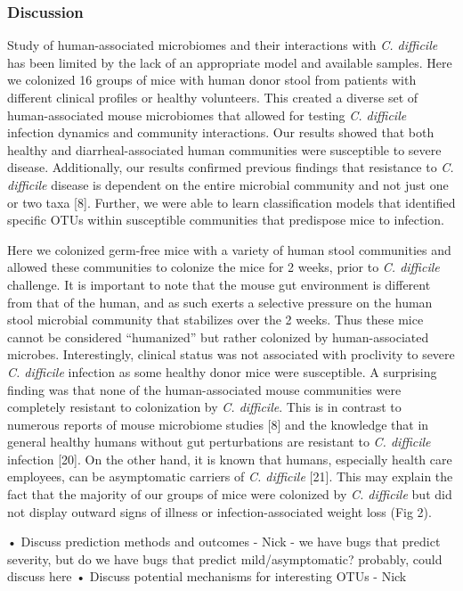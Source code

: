 \documentclass[11pt,]{article}
\begin{document}
\subsubsection{Discussion}\label{discussion}

Study of human-associated microbiomes and their interactions with
\emph{C. difficile} has been limited by the lack of an appropriate model
and available samples. Here we colonized 16 groups of mice with human
donor stool from patients with different clinical profiles or healthy
volunteers. This created a diverse set of human-associated mouse
microbiomes that allowed for testing \emph{C. difficile} infection
dynamics and community interactions. Our results showed that both
healthy and diarrheal-associated human communities were susceptible to
severe disease. Additionally, our results confirmed previous findings
that resistance to \emph{C. difficile} disease is dependent on the
entire microbial community and not just one or two taxa {[}8{]}.
Further, we were able to learn classification models that identified
specific OTUs within susceptible communities that predispose mice to
infection.

Here we colonized germ-free mice with a variety of human stool
communities and allowed these communities to colonize the mice for 2
weeks, prior to \emph{C. difficile} challenge. It is important to note
that the mouse gut environment is different from that of the human, and
as such exerts a selective pressure on the human stool microbial
community that stabilizes over the 2 weeks. Thus these mice cannot be
considered ``humanized'' but rather colonized by human-associated
microbes. Interestingly, clinical status was not associated with
proclivity to severe \emph{C. difficile} infection as some healthy donor
mice were susceptible. A surprising finding was that none of the
human-associated mouse communities were completely resistant to
colonization by \emph{C. difficile}. This is in contrast to numerous
reports of mouse microbiome studies {[}8{]} and the knowledge that in
general healthy humans without gut perturbations are resistant to
\emph{C. difficile} infection {[}20{]}. On the other hand, it is known
that humans, especially health care employees, can be asymptomatic
carriers of \emph{C. difficile} {[}21{]}. This may explain the fact that
the majority of our groups of mice were colonized by \emph{C. difficile}
but did not display outward signs of illness or infection-associated
weight loss (Fig 2).

• Discuss prediction methods and outcomes - Nick - we have bugs that
predict severity, but do we have bugs that predict mild/asymptomatic?
probably, could discuss here • Discuss potential mechanisms for
interesting OTUs - Nick
\end{document}
